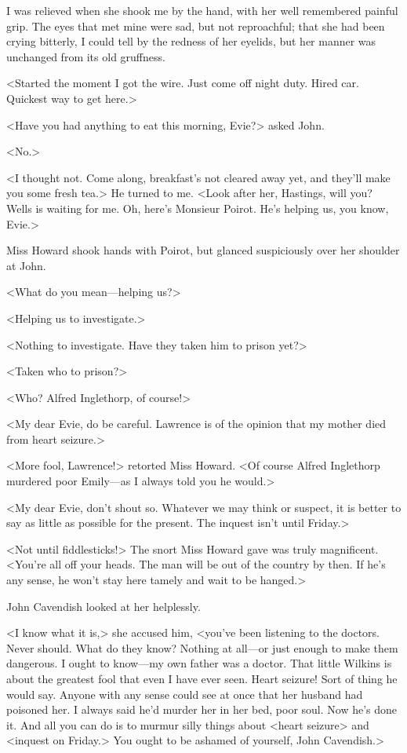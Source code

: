 I was relieved when she shook me by the hand, with her well remembered painful grip. The eyes that met mine were sad, but not reproachful; that she had been crying bitterly, I could tell by the redness of her eyelids, but her manner was unchanged from its old gruffness. 

 <Started the moment I got the wire. Just come off night duty. Hired car. Quickest way to get here.> 

 <Have you had anything to eat this morning, Evie?> asked John. 

 <No.> 

 <I thought not. Come along, breakfast's not cleared away yet, and they'll make you some fresh tea.> He turned to me. <Look after her, Hastings, will you? Wells is waiting for me. Oh, here's Monsieur Poirot. He's helping us, you know, Evie.> 

 Miss Howard shook hands with Poirot, but glanced suspiciously over her shoulder at John. 

 <What do you mean—helping us?> 

 <Helping us to investigate.> 

 <Nothing to investigate. Have they taken him to prison yet?> 

 <Taken who to prison?> 

 <Who? Alfred Inglethorp, of course!> 

 <My dear Evie, do be careful. Lawrence is of the opinion that my mother died from heart seizure.> 

 <More fool, Lawrence!> retorted Miss Howard. <Of course Alfred Inglethorp murdered poor Emily—as I always told you he would.> 

 <My dear Evie, don't shout so. Whatever we may think or suspect, it is better to say as little as possible for the present. The inquest isn't until Friday.> 

 <Not until fiddlesticks!> The snort Miss Howard gave was truly magnificent. <You're all off your heads. The man will be out of the country by then. If he's any sense, he won't stay here tamely and wait to be hanged.> 

 John Cavendish looked at her helplessly. 

 <I know what it is,> she accused him, <you've been listening to the doctors. Never should. What do they know? Nothing at all—or just enough to make them dangerous. I ought to know—my own father was a doctor. That little Wilkins is about the greatest fool that even I have ever seen. Heart seizure! Sort of thing he would say. Anyone with any sense could see at once that her husband had poisoned her. I always said he'd murder her in her bed, poor soul. Now he's done it. And all you can do is to murmur silly things about <heart seizure> and <inquest on Friday.> You ought to be ashamed of yourself, John Cavendish.> 

